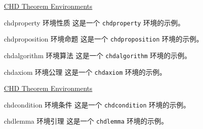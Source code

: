 \documentclass[11pt,aspectratio=43,xcolor={dvipsnames},hyperref={pdftex,pdfpagemode=UseNone,hidelinks,pdfdisplaydoctitle=true},usepdftitle=false]{ctexbeamer}
\begin{document}
\begin{frame}{\underline{CHD Theorem Environments}}
  \begin{chdproperty}{chdproperty 环境性质}
    这是一个 \texttt{chdproperty} 环境的示例。
  \end{chdproperty}
  \begin{chdproposition}{chdproposition 环境命题}
    这是一个 \texttt{chdproposition} 环境的示例。
  \end{chdproposition}
  \begin{chdalgorithm}{chdalgorithm 环境算法}
    这是一个 \texttt{chdalgorithm} 环境的示例。
  \end{chdalgorithm}
  \begin{chdaxiom}{chdaxiom 环境公理}
    这是一个 \texttt{chdaxiom} 环境的示例。
  \end{chdaxiom}
\end{frame}

\begin{frame}{\underline{CHD Theorem Environments}}
  \begin{chdcondition}{chdcondition 环境条件}
    这是一个 \texttt{chdcondition} 环境的示例。
  \end{chdcondition}
  \begin{chdlemma}{chdlemma 环境引理}
    这是一个 \texttt{chdlemma} 环境的示例。
  \end{chdlemma}
\end{frame}

\begin{frame}
  \begin{center}
    \Huge{}
  \end{center}
\end{frame}
\end{document}
